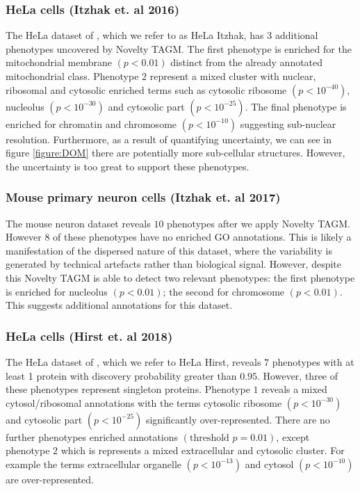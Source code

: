\documentclass[12pt,english]{article}
\begin{document}
\subsubsection{HeLa cells (Itzhak et. al 2016)}
The HeLa dataset of \cite{Itzhak:2016}, which we refer to as HeLa Itzhak, has $3$ additional phenotypes uncovered by Novelty TAGM. The first phenotype is enriched for the mitochondrial membrane $(p < 0.01)$ distinct from the already annotated mitochondrial class. Phenotype $2$ represent a mixed cluster with nuclear, ribosomal and cytosolic enriched terms such as cytosolic ribosome $(p < 10^{-40})$, nucleolus $(p < 10^{-30})$ and cytosolic part $(p < 10^{-25})$. The final phenotype is enriched for chromatin and chromosome $(p < 10^{-10})$ suggesting sub-nuclear resolution. Furthermore, as a result of quantifying uncertainty, we can see in figure \ref{figure:DOM} there are potentially more sub-cellular structures. However, the uncertainty is too great to support these phenotypes. 
\subsubsection{Mouse primary neuron cells (Itzhak et. al 2017)}
The mouse neuron dataset reveals $10$ phenotypes after we apply Novelty TAGM. However $8$ of these phenotypes have no enriched GO annotations. This is likely a manifestation of the dispersed nature of this dataset, where the variability is generated by technical artefacts rather than biological signal. However, despite this Novelty TAGM is able to detect two relevant phenotypes: the first phenotype is enriched for nucleolus $(p < 0.01)$; the second for chromosome $(p < 0.01)$. This suggests additional annotations for this dataset.
\subsubsection{HeLa cells (Hirst et. al 2018)}
The HeLa dataset of \cite{Hirst:2018}, which we refer to HeLa Hirst, reveals $7$ phenotypes with at least 1 protein with discovery probability greater than $0.95$. However, three of these phenotypes represent singleton proteins. Phenotype $1$ reveals a mixed cytosol/ribosomal annotations with the terms cytosolic ribosome $(p < 10^{-30})$ and cytosolic part $(p < 10^{-25})$ significantly over-represented. There are no further phenotypes enriched annotations $(\text{threshold } p = 0.01)$, except phenotype $2$ which is represents a mixed extracellular and cytosolic cluster. For example the terms extracellular organelle $(p <10^{-13})$ and cytosol $(p < 10^{-10})$ are over-represented.
\end{document}

